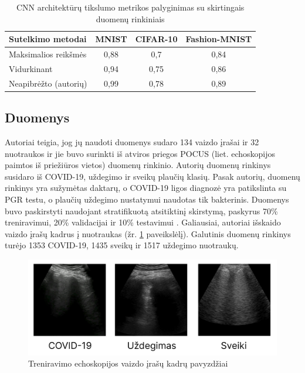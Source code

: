 \documentclass[fleqn]{VUMIFKompMagistrinis}
\begin{document}
\begin{table}[H]\footnotesize
  \centering
\caption{CNN architektūrų tikslumo metrikos palyginimas su skirtingais duomenų rinkiniais}
\begin{tabular}{|l|c|c|c|}
\hline
Sutelkimo metodai & MNIST & CIFAR-10 & Fashion-MNIST \\
\hline
Maksimalios reikšmės & 0,88 & 0,7 & 0,84 \\
Vidurkinant & 0,94 & 0,75 & 0,86 \\
Neapibrėžto (autorių) & 0,99 & 0,78 & 0,89 \\
\hline
  \end{tabular}
  \label{tab:fuzzylentele}
\end{table}

\subsection{Duomenys}\label{sec:duomenys2}
Autoriai teigia, jog jų naudoti duomenys sudaro 134 vaizdo įrašai ir 32 nuotraukos ir jie buvo surinkti iš atviros priegos POCUS (liet. echoskopijos paimtos iš priežiūros vietos) duomenų rinkinio. Autorių duomenų rinkinys susidaro iš COVID-19, uždegimo ir sveikų plaučių klasių. Pasak autorių, duomenų rinkinys yra sužymėtas daktarų, o COVID-19 ligos diagnozė yra patikslinta su PGR testu, o plaučių uždegimo nustatymui naudotas tik bakterinis. Duomenys buvo paskirstyti naudojant stratifikuotą atsitiktinį skirstymą, paskyrus 70\% treniravimui, 20\% validacijai ir 10\% testavimui \cite{HASAN2023}. Galiausiai, autoriai išskaido vaizdo įrašų kadrus į nuotraukas (žr. \ref{img:plauciai} paveikslėlį). Galutinis duomenų rinkinys turėjo 1353 COVID-19, 1435 sveikų ir 1517 uždegimo nuotraukų. 
\begin{figure}[H]
    \centering
    \includegraphics[scale=0.40]{img/plauciai.PNG}
    \caption{Treniravimo echoskopijos vaizdo įrašų kadrų pavyzdžiai \cite{HASAN2023}}
    \label{img:plauciai}
\end{figure}\par
\end{document}
